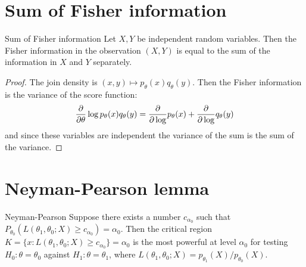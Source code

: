 \documentclass[12pt]{extarticle}
\begin{document}
\section{Sum of Fisher information}

\begin{lemma}{Sum of Fisher information}
	Let $X, Y$ be independent random variables.
	Then the Fisher information in the observation $(X, Y)$ is equal to the sum
	of the information in $X$ and $Y$ separately.
\end{lemma}

\begin{proof}
	The join density is $(x, y) \mapsto p_\theta(x) q_\theta(y)$.
	Then the Fisher information is the variance of the score function:
	\begin{equation}
		\pdv{\theta} \log p_\theta(x) q_\theta(y) = \pdv \log p_\theta(x) + \pdv \log q_\theta(y)
	\end{equation}
	and since these variables are independent the variance of the sum is the sum of the variance.
\end{proof}

\section{Neyman-Pearson lemma}

\begin{theorem}{Neyman-Pearson}{}
	Suppose there exists a number $c_{\alpha_0}$ such that
	$P_{\theta_0}(L(\theta_1, \theta_0; X) \geq c_{\alpha_0}) = \alpha_0$.
	Then the critical region
	$K = \{ x: L(\theta_1, \theta_0; X) \geq c_{\alpha_0} \} = \alpha_0$
	is the most powerful at level $\alpha_0$
	for testing $H_0: \theta = \theta_0$ against $H_1: \theta = \theta_1$,
	where $L(\theta_1, \theta_0; X) = p_{\theta_1}(X) / p_{\theta_0}(X)$.
\end{theorem}
\end{document}
